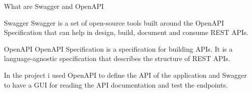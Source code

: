 \documentclass{beamer}
\begin{document}
\begin{frame}{What are Swagger and OpenAPI}
	\label{swagger_openapi}
	\begin{block}{Swagger}
		Swagger is a set of open-source tools built around the OpenAPI Specification that can help in design, build, document and consume REST APIs.
\end{block}
\begin{block}{OpenAPI}
		OpenAPI Specification is a specification for building APIs. It is a language-agnostic specification that describes the structure of REST APIs.
\end{block}
In the project i used OpenAPI to define the API of the application and Swagger to have a GUI for reading the API documentation and test the endpoints.
\newline
\hyperlink{index_1}{}
\end{frame}
\end{document}
